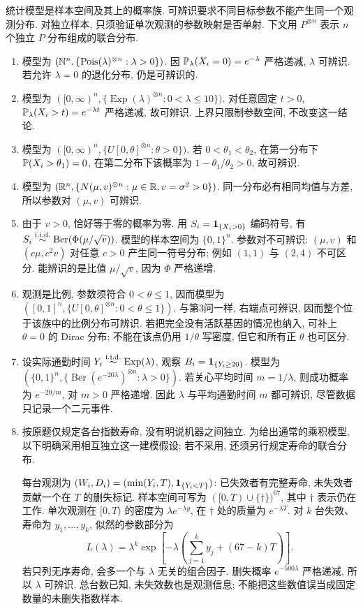 \begin{solution}
统计模型是样本空间及其上的概率族. 可辨识要求不同目标参数不能产生同一个观测分布. 对独立样本, 只须验证单次观测的参数映射是否单射. 下文用 $P^{\otimes n}$ 表示 $n$ 个独立 $P$ 分布组成的联合分布.
\begin{enumerate}[label=\arabic*.]
\item 模型为 $(\mathbb N^n,\{\operatorname{Pois}(\lambda)^{\otimes n}:\lambda>0\})$. 因 $\mathbb P_\lambda(X_i=0)=e^{-\lambda}$ 严格递减, $\lambda$ 可辨识. 若允许 $\lambda=0$ 的退化分布, 仍是可辨识的.
\item 模型为 $([0,\infty)^n,\{\operatorname{Exp}(\lambda)^{\otimes n}:0<\lambda\le10\})$. 对任意固定 $t>0$, $\mathbb P_\lambda(X_i>t)=e^{-\lambda t}$ 严格递减, 故可辨识. 上界只限制参数空间, 不改变这一结论.
\item 模型为 $([0,\infty)^n,\{U[0,\theta]^{\otimes n}:\theta>0\})$. 若 $0<\theta_1<\theta_2$, 在第一分布下 $\mathbb P(X_i>\theta_1)=0$, 在第二分布下该概率为 $1-\theta_1/\theta_2>0$, 故可辨识.
\item 模型为 $(\mathbb R^n,\{N(\mu,v)^{\otimes n}:\mu\in\mathbb R,v=\sigma^2>0\})$. 同一分布必有相同均值与方差, 所以参数对 $(\mu,v)$ 可辨识.
\item 由于 $v>0$, 恰好等于零的概率为零. 用 $S_i=\mathbf 1_{\{X_i>0\}}$ 编码符号, 有
$S_i\stackrel{\mathrm{i.i.d.}}{\sim}\operatorname{Ber}(\Phi(\mu/\sqrt v))$.
模型的样本空间为 $\{0,1\}^n$. 参数对不可辨识: $(\mu,v)$ 和 $(c\mu,c^2v)$ 对任意 $c>0$ 产生同一符号分布; 例如 $(1,1)$ 与 $(2,4)$ 不可区分. 能辨识的是比值 $\mu/\sqrt v$, 因为 $\Phi$ 严格递增.
\item 观测是比例, 参数须符合 $0<\theta\le1$, 因而模型为 $([0,1]^n,\{U[0,\theta]^{\otimes n}:0<\theta\le1\})$. 与第3问一样, 右端点可辨识, 因而整个位于该族中的比例分布可辨识. 若把完全没有活跃基因的情况也纳入, 可补上 $\theta=0$ 的 Dirac 分布; 不能在该点仍用 $1/\theta$ 写密度, 但它和所有正 $\theta$ 也可区分.
\item 设实际通勤时间 $Y_i\stackrel{\mathrm{i.i.d.}}{\sim}\operatorname{Exp}(\lambda)$, 观察 $B_i=\mathbf 1_{\{Y_i\ge20\}}$. 模型为
$(\{0,1\}^n,\{\operatorname{Ber}(e^{-20\lambda})^{\otimes n}:\lambda>0\})$.
若关心平均时间 $m=1/\lambda$, 则成功概率为 $e^{-20/m}$, 对 $m>0$ 严格递增. 因此 $\lambda$ 与平均通勤时间 $m$ 都可辨识, 尽管数据只记录一个二元事件.
\item 按原题仅规定各台指数寿命, 没有明说机器之间独立. 为给出通常的乘积模型, 以下明确采用相互独立这一建模假设; 若不采用, 还须另行规定寿命的联合分布.

每台观测为 $(W_i,D_i)=(\min(Y_i,T),\mathbf 1_{\{Y_i<T\}})$: 已失效者有完整寿命, 未失效者贡献一个在 $T$ 的删失标记. 样本空间可写为 $([0,T)\cup\{\dagger\})^{67}$, 其中 $\dagger$ 表示仍在工作. 单次观测在 $[0,T)$ 的密度为 $\lambda e^{-\lambda y}$, 在 $\dagger$ 处的质量为 $e^{-\lambda T}$. 对 $k$ 台失效、寿命为 $y_1,\ldots,y_k$, 似然的参数部分为
\[
L(\lambda)=\lambda^k\exp\left[-\lambda\left(\sum_{j=1}^ky_j+(67-k)T\right)\right].
\]
若只列无序寿命, 会多一个与 $\lambda$ 无关的组合因子. 删失概率 $e^{-500\lambda}$ 严格递减, 所以 $\lambda$ 可辨识. 总台数已知, 未失效数也是观测信息; 不能把这些数值误当成固定数量的未删失指数样本.
\end{enumerate}
\end{solution}

